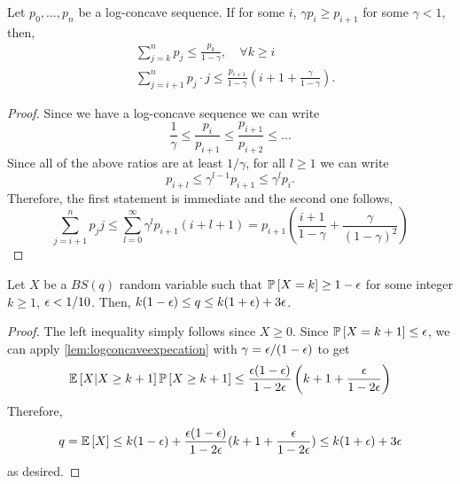 \begin{lemma}\label{lem:logconcaveexpecation}
Let $p_0,\dots,p_n$ be a log-concave sequence. If for some $i$, $\gamma p_i \geq p_{i+1}$ for some $\gamma<1$, then,
\begin{align*} 
& \sum_{j=k}^n p_j \leq \frac{p_k}{1-\gamma}, \quad \forall k\geq i\\
& \sum_{j=i+1}^n  p_j\cdot j  \leq \frac{p_{i+1}}{1-\gamma} \left(i+1 + \frac\gamma{1-\gamma}\right).	
\end{align*}
\end{lemma}
\begin{proof}
Since we have a log-concave sequence we can write
\begin{equation}\label{eq:logconcaveseq} \frac{1}{\gamma} \leq \frac{p_i}{p_{i+1}}  \leq \frac{p_{i+1}}{p_{i+2}} \leq \dots 	
\end{equation}
Since all of the above ratios are at least $1/\gamma$, for all $l\geq 1$ we can write
$$  p_{i+l} \leq \gamma^{l-1} p_{i+1}\leq \gamma^l p_i.$$
Therefore, the first statement is immediate and the second one follows,
$$ \sum_{j=i+1}^ n p_j j \leq \sum_{l=0}^\infty \gamma^l p_{i+1} (i+l+1) = p_{i+1} \left(\frac{i+1}{1-\gamma} + \frac\gamma{(1-\gamma)^2}\right)$$
\end{proof}

\begin{corollary}\label{cor:logconcaveexpecation}
	Let $X$ be a $BS(q)$ random variable such that ${\mathbb{P}}\left[X=k\right]\geq 1-{\epsilon}$ for some integer $k\geq 1$, ${\epsilon}<1/10$.
	Then, $k(1-{\epsilon})\leq q\leq k(1+{\epsilon})+3{\epsilon}$.
\end{corollary}
\begin{proof}
	The left inequality simply follows since $X\geq 0$. 	Since ${\mathbb{P}}\left[X=k+1\right]\leq {\epsilon}$, we can apply \cref{lem:logconcaveexpecation}  with $\gamma={\epsilon}/(1-{\epsilon})$ to get 
	$${\mathbb{E}}\left[X | X\geq k+1\right]{\mathbb{P}}\left[X\geq k+1\right]\leq \frac{{\epsilon}(1-{\epsilon})}{1-2{\epsilon}}\left(k+1+\frac{{\epsilon}}{1-2{\epsilon}}\right)$$
	Therefore,
	$$ q={\mathbb{E}}\left[X\right]\leq k(1-{\epsilon})+\frac{{\epsilon}(1-{\epsilon})}{1-2{\epsilon}}(k+1+\frac{{\epsilon}}{1-2{\epsilon}})\leq k(1+{\epsilon})+3{\epsilon}$$
	as desired.
\end{proof}


